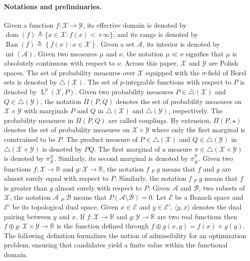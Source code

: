 \documentclass{article}
\newcommand{\eqas}[1]{\displaystyle\mathop{ \stackrel{a.s.}{=}}_{#1}}
\newcommand{\geqas}[1]{\displaystyle\mathop{ \stackrel{a.s.}{\geq}}_{#1}}
\newcommand{\subsetas}[1]{\displaystyle\mathop{ \stackrel{a.s.}{\subset}}_{#1}}
\begin{document}
\paragraph{Notations and preliminaries.}
Given a function $f: \mathcal{X} \to \mathcal{Y}$, its effective domain is denoted by $\operatorname{dom}(f) \triangleq \{x \in \mathcal{X}: f(x) < +\infty\}$; and its range is denoted by $\operatorname{Ran}(f) \triangleq \left\lbrace f(x) : x \in \mathcal{X} \right\rbrace$. Given a set $\mathcal{A}$, its interior is denoted by $\operatorname{int}(\mathcal A)$. 
Given two measures $\mu$ and $\nu$, the notation $\mu \ll \nu$ signifies that $\mu$ is absolutely continuous with respect to $\nu$. Across this paper, $\mathcal{X}$ and $\mathcal{Y}$ are Polish spaces.
The set of probability measures over $\mathcal{X}$ equipped with the $\sigma$-field of Borel sets is denoted by $\triangle(\mathcal{X})$.
The set of $p$-integrable functions with respect to $P$ is denoted by $\operatorname{L}^p(\mathcal{X},P)$.
Given two probability measures $P \in \triangle(\mathcal{X})$ and $Q \in \triangle(\mathcal{Y})$, the notation $\Pi(P,Q)$ denotes the set of probability measures on $\mathcal{X}\times \mathcal{Y}$ with marginals $P$ and $Q$ in $\triangle(\mathcal{X})$ and $\triangle(\mathcal{Y})$, respectively. The probability measures in $\Pi(P,Q)$ are called couplings. By extension, $\Pi(P, \star)$ denotes the set of probability measures on $\mathcal{X} \times \mathcal{Y}$ where only the first marginal is constrained to be $P$. The product measure of $P \in \triangle(\mathcal{X})$ and $Q \in \triangle(\mathcal{Y})$ in $\triangle(\mathcal{X}\times\mathcal{Y})$ is denoted by $PQ$. The first marginal of a measure $\pi \in \triangle(\mathcal X \times \mathcal Y)$ is denoted by $\pi_{\#}^{\mathcal{X}}$. Similarly, its second marginal is denoted by $\pi_{\#}^{\mathcal{Y}}$. Given two functions $f : \mathcal{X}\to\mathbb{R}$ and $g : \mathcal{X}\to\mathbb{R}$, the notation $f \eqas{P} g$ means that $f$ and $g$ are almost surely equal with respect to $P$. Similarly, the notation $f \geqas{P} g$ means that $f$ is greater than $g$ almost surely with respect to $P$. Given $\mathcal A$ and $\mathcal B$, two subsets of $\mathcal{X}$, the notation $\mathcal A \subsetas{P} \mathcal{B}$ means that $P(\mathcal A \setminus \mathcal B) = 0$. Let $\mathcal E$ be a Banach space and $\mathcal E'$ be its topological dual space.
Given $x \in \mathcal E $ and $y \in \mathcal E'$, $\langle y,x \rangle$ denotes the dual pairing between $y$ and $x$.
If $f : \mathcal{X} \to \mathbb{R}$ and $g : \mathcal{Y} \to \mathbb{R}$ are two real functions then $f\oplus g : \mathcal{X}\times\mathcal{Y}\to \mathbb{R}$ is the function defined through $f\oplus g (x,y) = f(x)+g(y)$. The following definition formalizes the notion of admissibility for an optimization problem, ensuring that candidates yield a finite value within the functional domain.
\end{document}
